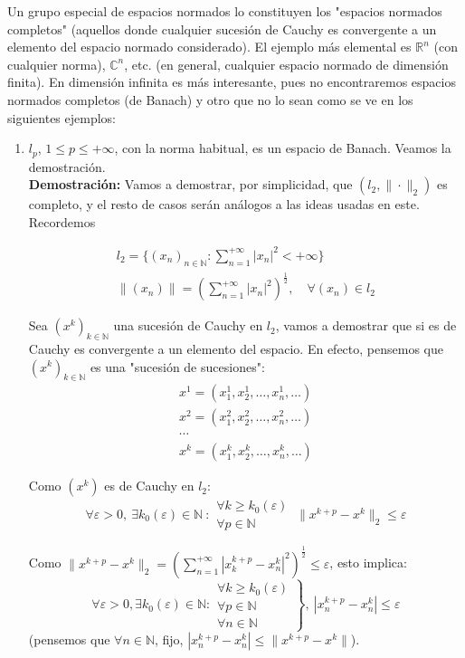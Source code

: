 \documentclass{article}
\begin{document}
Un grupo especial de espacios normados lo constituyen los "espacios normados completos" (aquellos donde cualquier sucesión de Cauchy es convergente a un elemento del espacio normado considerado). El ejemplo más elemental es $\mathbb{R}^n$ (con cualquier norma), $\mathbb{C}^n$, etc. (en general, cualquier espacio normado de dimensión finita). En dimensión infinita es más interesante, pues no encontraremos espacios normados completos (de Banach) y otro que no lo sean como se ve en los siguientes ejemplos:

\begin{enumerate}
\item $l_p$, $1\leq p\leq +\infty$, con la norma habitual, es un espacio de Banach. Veamos la demostración.\\

\textbf{Demostración:} Vamos a demostrar, por simplicidad, que $(l_2,\|\cdot\|_2)$ es completo, y el resto de casos serán análogos a las ideas usadas en este. Recordemos

\begin{gather*}
l_2=\{(x_n)_{n\in\mathbb{N}}:\sum_{n=1}^{+\infty}|x_n|^2<+\infty\}\\
\|(x_n)\|=\left(\sum_{n=1}^{+\infty}|x_n|^2\right)^\frac{1}{2},\quad \forall (x_n)\in l_2
\end{gather*}

Sea $(x^k)_{k\in\mathbb{N}}$ una sucesión de Cauchy en $l_2$, vamos a demostrar que si es de Cauchy es convergente a un elemento del espacio. En efecto, pensemos que $(x^k)_{k\in\mathbb{N}}$ es una "sucesión de sucesiones":
\begin{gather*}
x^1=(x^1_1,x_2^1,\ldots,x_n^1,\ldots)\\
x^2=(x^2_1,x_2^2,\ldots,x_n^2,\ldots)\\
\cdots\\
x^k=(x^k_1,x_2^k,\ldots,x_n^k,\ldots)
\end{gather*}

Como $(x^k)$ es de Cauchy en $l_2$:
\begin{equation*}
\forall \varepsilon >0,\:\exists k_0(\varepsilon)\in\mathbb{N}\::\left.\begin{array}{c}
\forall k\geq k_0(\varepsilon)\\
\forall p\in\mathbb{N}
\end{array}\right.\:\|x^{k+p}-x^k\|_2\leq \varepsilon
\end{equation*}

Como $\|x^{k+p}-x^k\|_2=\left(\sum_{n=1}^{+\infty}|x_k^{k+p}-x_n^k|^2\right)^\frac{1}{2}\leq \varepsilon$, esto implica:
\begin{equation*}
\forall \varepsilon >0, \exists k_0(\varepsilon)\in\mathbb{N}:\left.\begin{array}{c}
\forall k\geq k_0(\varepsilon)\\
\forall p\in\mathbb{N}\\
\forall n\in\mathbb{N}
\end{array}\right\rbrace,\:|x_n^{k+p}-x_n^k|\leq \varepsilon
\end{equation*}
(pensemos que $\forall n\in\mathbb{N}$, fijo, $|x_n^{k+p}-x_n^k|\leq \|x^{k+p}-x^k\|$).\\


\end{enumerate}
\end{document}
